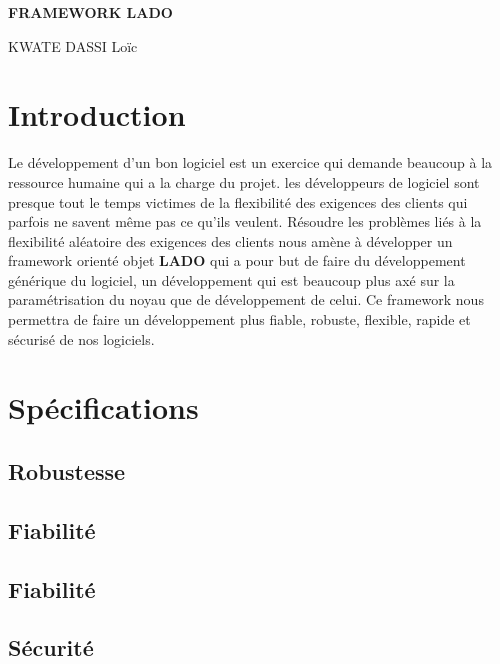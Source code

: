 \documentclass[12pt,a4paper]{report}
\author{KWATE DASSI LOIC}
\begin{document}
\begin{center}
\begin{Huge}
\textbf{FRAMEWORK LADO}
\end{Huge}
\end{center}
\begin{LARGE}
\begin{center}
KWATE DASSI Loïc\\
\end{center}
\end{LARGE}
\newpage
\tableofcontents
\newpage

\section{Introduction}
	Le développement d'un bon logiciel est un exercice qui demande beaucoup à la ressource humaine qui a la charge du projet. les développeurs de logiciel sont presque tout le temps victimes de la flexibilité des exigences des clients qui parfois ne savent même pas ce qu'ils veulent. Résoudre les problèmes liés à la flexibilité aléatoire des exigences des clients nous amène à développer un framework orienté objet \textbf{LADO} qui a pour but de faire du développement générique du logiciel, un développement qui est beaucoup plus axé sur la paramétrisation du noyau que de développement de celui. Ce framework nous permettra de faire un développement plus fiable, robuste, flexible, rapide et sécurisé de nos logiciels. 
	
\section{Spécifications}
\subsection{Robustesse}
\subsection{Fiabilité}
\subsection{Fiabilité}
\subsection{Sécurité}
\end{document}
